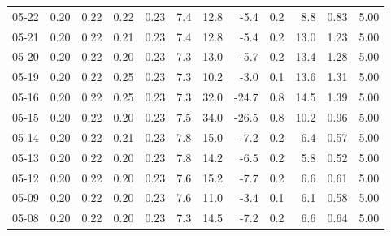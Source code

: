 \begin{threeparttable}
{\begin{tabular}{lrrrrrrrrrrr}
  05-22 &          0.20 &          0.22 &          0.22 &        0.23 &                 7.4 &                12.8 &       -5.4 &                 0.2 &              8.8 &            0.83 &                   5.00 \\
  05-21 &          0.20 &          0.22 &          0.21 &        0.23 &                 7.4 &                12.8 &       -5.4 &                 0.2 &             13.0 &            1.23 &                   5.00 \\
  05-20 &          0.20 &          0.22 &          0.20 &        0.23 &                 7.3 &                13.0 &       -5.7 &                 0.2 &             13.4 &            1.28 &                   5.00 \\
  05-19 &          0.20 &          0.22 &          0.25 &        0.23 &                 7.3 &                10.2 &       -3.0 &                 0.1 &             13.6 &            1.31 &                   5.00 \\
  05-16 &          0.20 &          0.22 &          0.25 &        0.23 &                 7.3 &                32.0 &      -24.7 &                 0.8 &             14.5 &            1.39 &                   5.00 \\
  05-15 &          0.20 &          0.22 &          0.20 &        0.23 &                 7.5 &                34.0 &      -26.5 &                 0.8 &             10.2 &            0.96 &                   5.00 \\
  05-14 &          0.20 &          0.22 &          0.21 &        0.23 &                 7.8 &                15.0 &       -7.2 &                 0.2 &              6.4 &            0.57 &                   5.00 \\
  05-13 &          0.20 &          0.22 &          0.20 &        0.23 &                 7.8 &                14.2 &       -6.5 &                 0.2 &              5.8 &            0.52 &                   5.00 \\
  05-12 &          0.20 &          0.22 &          0.20 &        0.23 &                 7.6 &                15.2 &       -7.7 &                 0.2 &              6.6 &            0.61 &                   5.00 \\
  05-09 &          0.20 &          0.22 &          0.20 &        0.23 &                 7.6 &                11.0 &       -3.4 &                 0.1 &              6.1 &            0.58 &                   5.00 \\
  05-08 &          0.20 &          0.22 &          0.20 &        0.23 &                 7.3 &                14.5 &       -7.2 &                 0.2 &              6.6 &            0.64 &                   5.00 \\

\end{tabular}}
\end{threeparttable}
